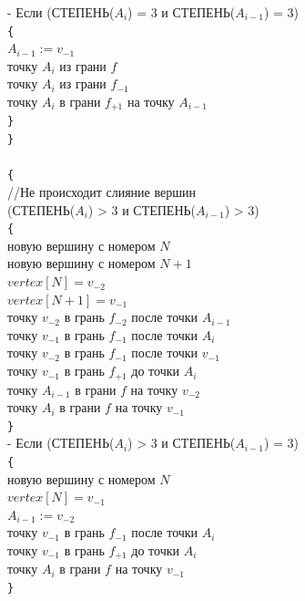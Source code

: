 \documentclass[a4paper,12pt, titlepage]{article}
\begin{document}
\begin{flushleft}
\quad\quad{} - Если (СТЕПЕНЬ($A_{i}$) = 3 и СТЕПЕНЬ($A_{i - 1}$) = 3)\\
\quad\quad\quad\verb"{"\\
\quad\quad\quad\quad$A_{i - 1} := v_{-1}$\\
\quad\quad\quad{} точку $A_{i}$ из грани $f$\\
\quad\quad\quad{} точку $A_{i}$ из грани $f_{-1}$\\
\quad\quad\quad{} точку $A_{i}$ в грани $f_{+1}$ на точку $A_{i - 1}$\\
\quad\quad\quad\verb"}"\\

\quad\quad\verb"}"\\
\quad{}\\
\quad\quad\verb"{"\\
\quad\quad\quad//Не происходит слияние вершин\\

\quad\quad{} (СТЕПЕНЬ($A_{i}$) > 3 и СТЕПЕНЬ($A_{i - 1}$) > 3)\\
\quad\quad\quad\verb"{"\\
\quad\quad\quad{} новую вершину с номером $N$\\
\quad\quad\quad{} новую вершину с номером $N + 1$\\
\quad\quad\quad\quad$vertex[N] = v_{-2}$\\
\quad\quad\quad\quad$vertex[N + 1] = v_{-1}$\\
\quad\quad\quad{} точку $v_{-2}$ в грань $f_{-2}$ после точки $A_{i - 1}$\\
\quad\quad\quad{} точку $v_{-1}$ в грань $f_{-1}$ после точки $A_{i}$\\
\quad\quad\quad{} точку $v_{-2}$ в грань $f_{-1}$ после точки $v_{-1}$\\
\quad\quad\quad{} точку $v_{-1}$ в грань $f_{+1}$ до точки $A_{i}$\\
\quad\quad\quad{} точку $A_{i - 1}$ в грани $f$ на точку $v_{-2}$ \\
\quad\quad\quad{} точку $A_{i}$ в грани $f$ на точку $v_{-1}$\\
\quad\quad\quad\verb"}"\\

\quad\quad{} - Если (СТЕПЕНЬ($A_{i}$) > 3 и СТЕПЕНЬ($A_{i - 1}$) = 3)\\
\quad\quad\quad\verb"{"\\
\quad\quad\quad{} новую вершину с номером $N$\\
\quad\quad\quad\quad$vertex[N] = v_{-1}$\\
\quad\quad\quad\quad$A_{i - 1} := v_{-2}$\\
\quad\quad\quad{} точку $v_{-1}$ в грань $f_{-1}$ после точки $A_{i}$\\
\quad\quad\quad{} точку $v_{-1}$ в грань $f_{+1}$ до точки $A_{i}$\\
\quad\quad\quad{} точку $A_{i}$ в грани $f$ на точку $v_{-1}$\\
\quad\quad\quad\verb"}"\\


\end{flushleft}
\end{document}
